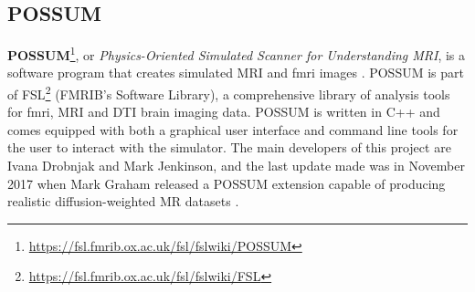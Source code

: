 \subsection{POSSUM}
\textbf{POSSUM}\footnote{\url{https://fsl.fmrib.ox.ac.uk/fsl/fslwiki/POSSUM}}, or \textit{Physics-Oriented Simulated Scanner for Understanding MRI}, is a software program that creates simulated MRI and \ac{fmri} images \cite{Drobnjak2006} \cite{Drobnjak2010}. 
POSSUM is part of FSL\footnote{\url{https://fsl.fmrib.ox.ac.uk/fsl/fslwiki/FSL}} (FMRIB's Software Library), a comprehensive library of analysis tools for \ac{fmri}, MRI and DTI brain imaging data.
POSSUM is written in C++ and comes equipped with both a graphical user interface and command line tools for the user to interact with the simulator.
The main developers of this project are Ivana Drobnjak and Mark Jenkinson, and the last update made was in November 2017 when Mark Graham released a POSSUM extension capable of producing realistic diffusion-weighted MR datasets \cite{Graham2016}.

\hfill

